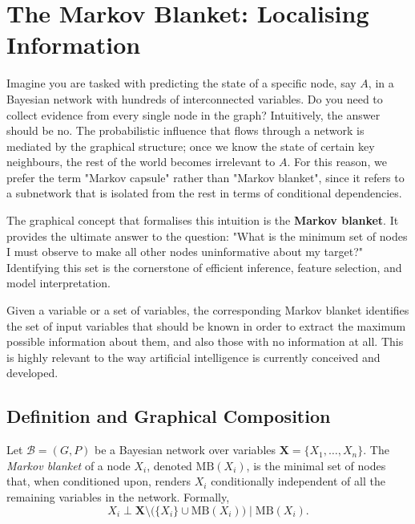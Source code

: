 \section{The Markov Blanket: Localising Information}\label{sec:markovblanket}

Imagine you are tasked with predicting the state of a specific node, say \(A\), in a Bayesian network with hundreds of interconnected variables. Do you need to collect evidence from every single node in the graph?
Intuitively, the answer should be no. The probabilistic influence that flows through a network is mediated by the graphical structure; once we know the state of certain key neighbours, the rest of the world becomes irrelevant to \(A\). For this reason, we prefer the term "Markov capsule" rather than "Markov blanket", since it refers to a subnetwork that is isolated from the rest in terms of conditional dependencies.

The graphical concept that formalises this intuition is the \textbf{Markov blanket}. It provides the ultimate answer to the question: "What is the minimum set of nodes I must observe to make all other nodes uninformative about my target?" Identifying this set is the cornerstone of efficient inference, feature selection, and model interpretation.

Given a variable or a set of variables, the corresponding Markov blanket identifies the set of input variables that should be known in order to extract the maximum possible information about them, and also those with no information at all. This is highly relevant to the way artificial intelligence is currently conceived and developed.

\subsection{Definition and Graphical Composition}

\begin{definition}
Let \(\mathcal{B} = (G, P)\) be a Bayesian network over variables \(\mathbf{X} = \{X_1, \dots, X_n\}\).
The \emph{Markov blanket} of a node \(X_i\), denoted \(\mathrm{MB}(X_i)\), is the minimal set of nodes that, when conditioned upon, renders \(X_i\) conditionally independent of all the remaining variables in the network. Formally,
\[
X_i \perp \mathbf{X} \setminus \bigl(\{X_i\} \cup \mathrm{MB}(X_i)\bigr) \;\big|\; \mathrm{MB}(X_i).
\]
\end{definition}

